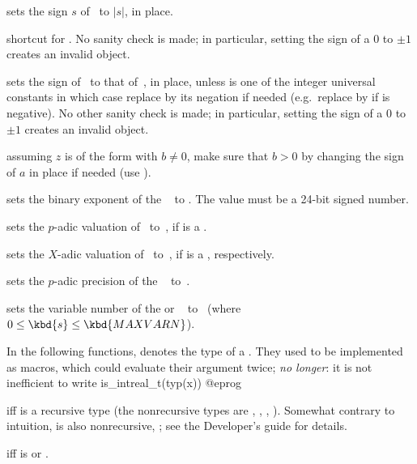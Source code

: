  sets the sign $s$ of~ to $|s|$, in place.

 shortcut for .
No sanity check is made; in particular, setting the sign of a
$0$  to $\pm1$ creates an invalid object.

 sets the sign of~ to that
of~, in place, unless  is one of the integer universal
constants in which case replace  by its negation if needed
(e.g.~replace  by  if  is negative). No other
sanity check is made; in particular, setting the sign of a $0$
 to $\pm1$ creates an invalid object.

 assuming $z$ is of the form 
with $b\neq 0$, make sure that $b > 0$ by changing the sign of $a$ in place if
needed (use ).

 sets the binary exponent of the
~ to . The value  must be a 24-bit signed
number.

 sets the $p$-adic valuation
of~ to~, if  is a .

 sets the $X$-adic valuation
of~ to~, if  is a , respectively.

 sets the $p$-adic precision of the
~ to~.

 sets the variable number of the 
or ~ to~ (where $0\le \kbd{s}\le\kbd{MAXVARN}$).

\label{se:typegroup}
In the following functions,  denotes the type of a .
They used to be implemented as macros, which could evaluate their argument
twice; \emph{no longer}: it is not inefficient to write
\bprog
  is_intreal_t(typ(x))
@eprog

  iff  is a recursive
type (the nonrecursive types are , ,
, ). Somewhat contrary to intuition,  is
also nonrecursive, ; see the Developer's guide for details.

  iff  is 
or .

